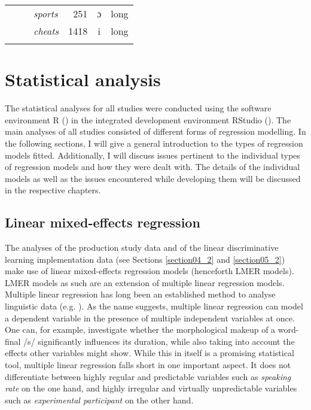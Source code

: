 \begin{table}
\begin{tabular}{lllrcl}
                                                                & ~                                                    & \textit{sports}  & 251       & ɔ     & long          \\
                                                                & ~                                                    & \textit{cheats}    & 1418      & i     & long          \\
\lspbottomrule
\end{tabular}
\end{table}

\section{Statistical analysis}\label{section03_2}

The statistical analyses for all studies were conducted using the software environment R (\cite{RCore2020}) in the integrated development environment RStudio (\cite{RStudio2020}). The main analyses of all studies consisted of different forms of regression modelling. In the following sections, I will give a general introduction to the types of regression models fitted. Additionally, I will discuss issues pertinent to the individual types of regression models and how they were dealt with. The details of the individual models as well as the issues encountered while developing them will be discussed in the respective chapters.

\subsection{Linear mixed-effects regression}\label{section03_2_1}

The analyses of the production study data and of the linear discriminative learning implementation data (see Sections \ref{section04_2} and \ref{section05_2}) make use of linear mixed-effects regression models (henceforth LMER models). LMER models as such are an extension of multiple linear regression models. Multiple linear regression has long been an established method to analyse linguistic data (e.g. \cite{Baayen2008, Winter2019}). As the name suggests, multiple linear regression can model a dependent variable in the presence of multiple independent variables at once. One can, for example, investigate whether the morphological makeup of a word-final /s/ significantly influences its duration, while also taking into account the effects other variables might show. While this in itself is a promising statistical tool, multiple linear regression falls short in one important aspect. It does not differentiate between highly regular and predictable variables such as \textit{speaking rate} on the one hand, and highly irregular and virtually unpredictable variables such as \textit{experimental participant} on the other hand. 

